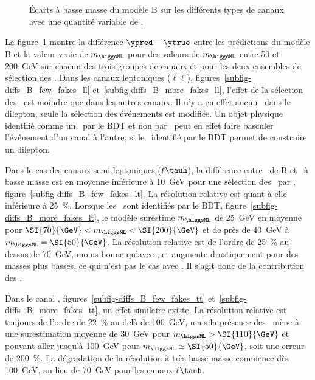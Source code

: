 \begin{figure}[p]
\caption[Effet des \ftauhs\ sur l'écart des prédictions du modèle B à la valeur vraie.]{Écarts à basse masse du modèle B sur les différents types de canaux avec une quantité variable de \ftauhs.}
\label{fig-diffs_fakes_B_tt-lt-ll}
\end{figure}
\par
La figure~\ref{fig-diffs_fakes_B_tt-lt-ll} montre la différence $\ypred-\ytrue$ entre les prédictions du modèle B et la valeur vraie de $m_{\higgsML}$ pour des valeurs de $m_{\higgsML}$ entre \num{50} et \SI{200}{\GeV} sur chacun des trois groupes de canaux et pour les deux ensembles de sélection des \tauh.
Dans les canaux leptoniques ($\ell\ell$),
figures~\ref{subfig-diffs_B_few_fakes_ll} et~\ref{subfig-diffs_B_more_fakes_ll},
l'effet de la sélection des \tauh\
est moindre que dans les autres canaux.
Il n'y a en effet aucun \tauh\ dans le dilepton, seule la sélection des événements est modifiée.
Un objet physique identifié comme un \tauh\ par le BDT et non par \DEEPTAU\ peut en effet faire basculer l'événement d'un canal à l'autre, si le \tauh\ identifié par le BDT permet de construire un dilepton.
\par
Dans le cas des canaux semi-leptoniques ($\ell\tauh$),
la différence entre \ypred\ de B et \ytrue\ à basse masse est en moyenne inférieure à \SI{10}{\GeV}
pour une sélection des \tauh\ par \DEEPTAU, figure~\ref{subfig-diffs_B_few_fakes_lt}.
La résolution relative est quant à elle inférieure à \SI{25}{\%}.
Lorsque les \tauh\ sont identifiés par le BDT,
figure~\ref{subfig-diffs_B_more_fakes_lt},
le modèle surestime $m_{\higgsML}$ de \SI{25}{\GeV} en moyenne pour $\SI{70}{\GeV} < m_{\higgsML} < \SI{200}{\GeV}$
et de près de \SI{40}{\GeV} à $m_{\higgsML}=\SI{50}{\GeV}$.
La résolution relative est de l'ordre de \SI{25}{\%} au-dessus de \SI{70}{\GeV},
moins bonne qu'avec \DEEPTAU,
et augmente drastiquement pour des masses plus basses, ce qui n'est pas le cas avec \DEEPTAU.
Il s'agit donc de la contribution des \ftauhs.
\par
Dans le canal \tauh\tauh,
figures~\ref{subfig-diffs_B_few_fakes_tt} et~\ref{subfig-diffs_B_more_fakes_tt},
un effet similaire existe.
La résolution relative est toujours de l'ordre de \SI{22}{\%} au-delà de \SI{100}{\GeV},
mais la présence des \ftauhs\ mène à une surestimation moyenne de \SI{30}{\GeV} pour $m_{\higgsML}>\SI{110}{\GeV}$
et pouvant aller jusqu'à \SI{100}{\GeV} pour $m_{\higgsML}\simeq\SI{50}{\GeV}$, soit une erreur de \SI{200}{\%}.
La dégradation de la résolution à très basse masse commence dès \SI{100}{\GeV}, au lieu de \SI{70}{\GeV} pour les canaux $\ell\tauh$.

